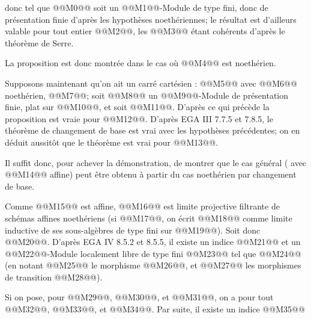 
donc tel que @@M0@@ soit un @@M1@@-Module de type fini, donc de présentation finie d'après les hypothèses noethériennes; le résultat est d'ailleurs valable pour tout entier @@M2@@, les @@M3@@ étant cohérents d'après le théorème de Serre.

La proposition est donc montrée dans le cas où @@M4@@ est noethérien.

Supposons maintenant qu'on ait un carré cartésien :
@@M5@@
avec @@M6@@ noethérien, @@M7@@; soit @@M8@@ un @@M9@@-Module de présentation finie, plat sur @@M10@@, et soit @@M11@@. D'après ce qui précède la proposition est vraie pour @@M12@@. D'après EGA III 7.7.5 et 7.8.5, le théorème de changement de base est vrai avec les hypothèses précédentes; on en déduit aussitôt que le théorème est vrai pour @@M13@@.

Il suffit donc, pour achever la démonstration, de montrer que le cas général ( avec @@M14@@ affine) peut être obtenu à partir du cas noethérien par changement de base.

Comme @@M15@@ est affine, @@M16@@ est limite projective filtrante de schémas affines noethériens (si @@M17@@, on écrit @@M18@@ comme limite inductive de ses sous-algèbres de type fini sur @@M19@@). Soit donc @@M20@@. D'après EGA IV 8.5.2 et 8.5.5, il existe un indice @@M21@@ et un @@M22@@-Module localement libre de type fini @@M23@@ tel que @@M24@@ (en notant @@M25@@ le morphisme @@M26@@, et @@M27@@ les morphismes de transition @@M28@@).

Si on pose, pour @@M29@@, @@M30@@, et @@M31@@, on a pour tout @@M32@@, @@M33@@, et @@M34@@. Par suite, il existe un indice @@M35@@
